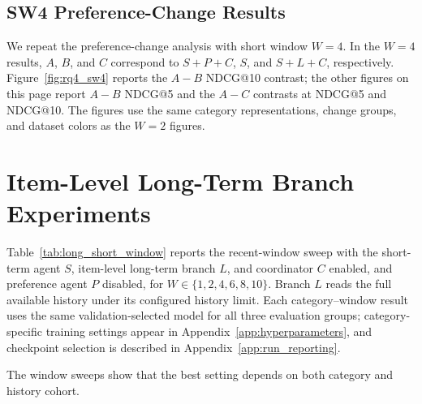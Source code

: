 ﻿\documentclass[sigconf,anonymous,review]{acmart}
\begin{document}
\subsection{SW4 Preference-Change Results}
\label{app:preference_change_sw4}

We repeat the preference-change analysis with short window $W=4$. In the $W=4$ results, $A$, $B$, and $C$ correspond to $S+P+C$, $S$, and $S+L+C$, respectively. Figure~\ref{fig:rq4_sw4} reports the $A-B$ NDCG@10 contrast; the other figures on this page report $A-B$ NDCG@5 and the $A-C$ contrasts at NDCG@5 and NDCG@10. The figures use the same category representations, change groups, and dataset colors as the $W=2$ figures.

\setlength{\dblfloatsep}{12pt}

\section{Item-Level Long-Term Branch Experiments}

\label{app:long_agent_window}
\label{sec:item_long_experiments}

Table~\ref{tab:long_short_window} reports the recent-window sweep with the short-term agent $S$, item-level long-term branch $L$, and coordinator $C$ enabled, and preference agent $P$ disabled, for $W\in\{1,2,4,6,8,10\}$. Branch $L$ reads the full available history under its configured history limit. Each category--window result uses the same validation-selected model for all three evaluation groups; category-specific training settings appear in Appendix~\ref{app:hyperparameters}, and checkpoint selection is described in Appendix~\ref{app:run_reporting}.

The window sweeps show that the best setting depends on both category and history cohort.
\end{document}
